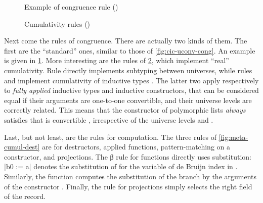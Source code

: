 \begin{figure}[ht]
  \ContinuedFloat
  \caption{Example of congruence rule ()}
  \label{fig:meta-cumul-cong}
\end{figure}

\begin{figure}[h]
  \ContinuedFloat
  \caption{Cumulativity rules ()}
  \label{fig:meta-cumul-cumul}
\end{figure}

Next come the rules of congruence. There are actually two kinds of them. The first are the
“standard” ones, similar to those of \cref{fig:cic-uconv-cong}. An example
is given in \cref{fig:meta-cumul-cong}.
More interesting are the rules of
\cref{fig:meta-cumul-cumul}, which implement “real” cumulativity. Rule  directly
implements subtyping between universes, while rules  and 
implement cumulativity of inductive types . The latter two apply respectively
to \emph{fully applied} inductive types and inductive constructors, that can be considered equal
if their arguments are one-to-one convertible, and their universe levels are correctly related.
This means that \eg the  constructor of polymorphic lists \emph{always} satisfies that
 is convertible , irrespective of the universe levels 
and .

\begin{figure*}
  \ContinuedFloat
  \caption{Computation rules for destructors ()}
  \label{fig:meta-cumul-dest}
\end{figure*}

Last, but not least, are the rules for computation.
The three rules of \cref{fig:meta-cumul-dest} are for destructors, \ie applied functions,
pattern-matching on a constructor, and projections. The β rule for functions directly uses
substitution: \coqe|b{0 := a}| denotes the substitution of  for the variable of de Bruijn
index  in . Similarly, the
 function computes the substitution of the branch  by the arguments
of the constructor .
Finally, the rule for projections simply selects the right field of the record.

